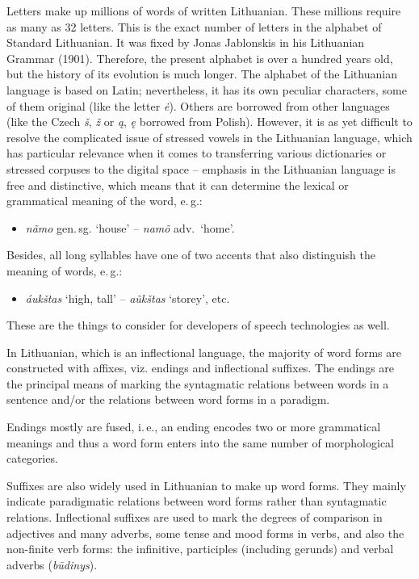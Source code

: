 \begin{multicols}{2}
 Letters make up millions of words of written Lithuanian. These millions require as many as 32 letters. This is the exact number of letters in the alphabet of Standard Lithuanian. It was fixed by Jonas Jablonskis in his Lithuanian Grammar (1901). Therefore, the present alphabet is over a hundred years old, but the history of its evolution is much longer. The alphabet of the Lithuanian language is based on Latin; nevertheless, it has its own peculiar characters, some of them original (like the letter \textit{ė}). Others are borrowed from other languages (like the Czech \textit{š}, \textit{ž} or \textit{ą}, \textit{ę} borrowed from Polish). However, it is as yet difficult to resolve the complicated issue of stressed vowels in the Lithuanian language, which has particular relevance when it comes to transferring various dictionaries or stressed corpuses to the digital space – emphasis in the Lithuanian language is free and distinctive, which means that it can determine the lexical or grammatical meaning of the word, e.\,g.:

\begin{itemize}
\item[]     \textit{nãmo} gen.\,sg. `house' – \textit{namõ}  adv.~`home'.
\end{itemize}

Besides, all long syllables have one of two accents that also distinguish the meaning of words, e.\,g.:

\begin{itemize}
\item[]       \textit{áukštas } `high, tall' – \textit{aũkštas }  `storey', etc.
\end{itemize}

These are the things to consider for developers of speech technologies as well.

In Lithuanian, which is an inflectional language, the majority of word forms are constructed with affixes, viz. endings and inflectional suffixes. The endings are the principal means of marking the syntagmatic relations between words in a sentence and/or the relations between word forms in a paradigm.

Endings mostly are fused, i.\,e., an ending encodes two or more grammatical meanings and thus a word form enters into the same number of morphological categories.

Suffixes are also widely used in Lithuanian to make up word forms. They mainly indicate paradigmatic relations between word forms rather than syntagmatic relations. Inflectional suffixes are used to mark the degrees of comparison in adjectives and many adverbs, some tense and mood forms in verbs, and also the non-finite verb forms: the infinitive, participles (including gerunds) and verbal adverbs (\textit{būdinys}). 


\end{multicols}
